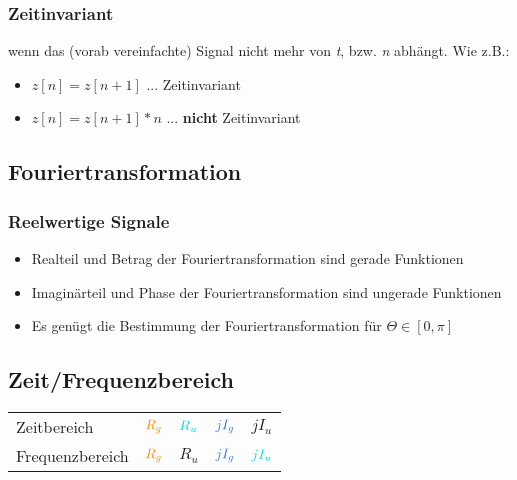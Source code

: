 \documentclass[a4paper, 12pt]{article}
\begin{document}
\subsubsection{Zeitinvariant}
wenn das (vorab vereinfachte) Signal nicht mehr von \textit{t}, bzw. \textit{n} abhängt. Wie z.B.:
\begin{itemize}
  \item $z[n] = z[n+1]$ ... Zeitinvariant
  \item $z[n] = z[n+1]*n$ ... \textbf{nicht} Zeitinvariant
\end{itemize}

\subsection{Fouriertransformation}

\subsubsection{Reelwertige Signale}

\begin{itemize}
    \item Realteil und Betrag der Fouriertransformation sind gerade Funktionen
    \item Imaginärteil und Phase der Fouriertransformation sind ungerade Funktionen
    \item Es genügt die Bestimmung der Fouriertransformation für $Θ ∈ [0,π]$
\end{itemize}

\subsection{Zeit/Frequenzbereich}

\begin{tabular}{lllll}
    Zeitbereich &
    $\color{orange} R_g$  &
    $\color{turquoise} R_u$  &
    $\color{bluegray} jI_g$ &
    $jI_u$\\

    Frequenzbereich &
    $\color{orange} R_g$  &
    $R_u$  &
    $\color{bluegray}jI_g$ &
    $\color{turquoise}jI_u$\\
\end{tabular}
\end{document}
